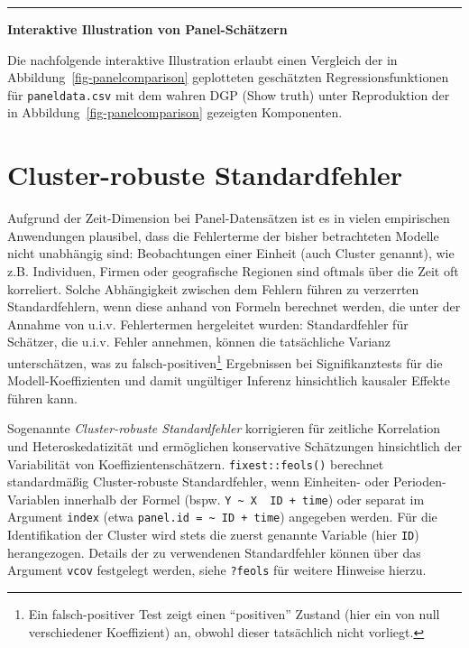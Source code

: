 \documentclass[
  a4paper,
  DIV=11,
  oneside]{scrreprt}
\begin{document}
\begin{center}\rule{0.5\linewidth}{0.5pt}\end{center}

\textbf{Interaktive Illustration von Panel-Schätzern}

Die nachfolgende interaktive Illustration erlaubt einen Vergleich der in
Abbildung~\ref{fig-panelcomparison} geplotteten geschätzten
Regressionsfunktionen für \texttt{paneldata.csv} mit dem wahren DGP
(Show truth) unter Reproduktion der in
Abbildung~\ref{fig-panelcomparison} gezeigten Komponenten.

\section{Cluster-robuste Standardfehler}\label{sec-crse}

Aufgrund der Zeit-Dimension bei Panel-Datensätzen ist es in vielen
empirischen Anwendungen plausibel, dass die Fehlerterme der bisher
betrachteten Modelle nicht unabhängig sind: Beobachtungen einer Einheit
(auch Cluster genannt), wie z.B. Individuen, Firmen oder geografische
Regionen sind oftmals über die Zeit oft korreliert. Solche Abhängigkeit
zwischen dem Fehlern führen zu verzerrten Standardfehlern, wenn diese
anhand von Formeln berechnet werden, die unter der Annahme von u.i.v.
Fehlertermen hergeleitet wurden: Standardfehler für Schätzer, die u.i.v.
Fehler annehmen, können die tatsächliche Varianz unterschätzen, was zu
falsch-positiven\footnote{Ein falsch-positiver Test zeigt einen
  ``positiven'' Zustand (hier ein von null verschiedener Koeffizient)
  an, obwohl dieser tatsächlich nicht vorliegt.} Ergebnissen bei
Signifikanztests für die Modell-Koeffizienten und damit ungültiger
Inferenz hinsichtlich kausaler Effekte führen kann.

Sogenannte \emph{Cluster-robuste Standardfehler} korrigieren für
zeitliche Korrelation und Heteroskedatizität und ermöglichen
konservative Schätzungen hinsichtlich der Variabilität von
Koeffizientenschätzern. \texttt{fixest::feols()} berechnet standardmäßig
Cluster-robuste Standardfehler, wenn Einheiten- oder Perioden-Variablen
innerhalb der Formel (bspw.
\texttt{Y\ \textasciitilde{}\ X\ \textbar{}\ ID\ +\ time}) oder separat
im Argument \texttt{index} (etwa
\texttt{panel.id\ =\ \textasciitilde{}\ ID\ +\ time}) angegeben werden.
Für die Identifikation der Cluster wird stets die zuerst genannte
Variable (hier \texttt{ID}) herangezogen. Details der zu verwendenen
Standardfehler können über das Argument \texttt{vcov} festgelegt werden,
siehe \texttt{?feols} für weitere Hinweise hierzu.
\end{document}
